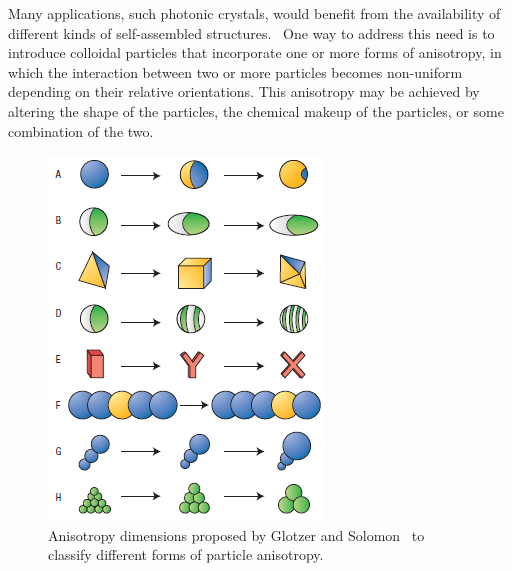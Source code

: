 Many applications, such photonic crystals, would benefit from the availability of different
kinds of self-assembled structures.~\cite{glotzer-solomon}  One way to address this need is to 
introduce colloidal particles that incorporate one or more forms of anisotropy, in which 
the interaction between two or more particles becomes non-uniform depending on 
their relative orientations.  This anisotropy may be achieved 
by altering the shape of the particles, the chemical makeup
of the particles, or 
some combination of the two.

\begin{figure}[h]
\begin{center}
\includegraphics{figures/glotzer-anisotropy-dimensions.png}
\end{center}
\caption{Anisotropy dimensions proposed by Glotzer and Solomon~\cite{glotzer-solomon} to classify 
different forms of particle anisotropy.}
\label{fig:glotzer-dimensions}
\end{figure}


